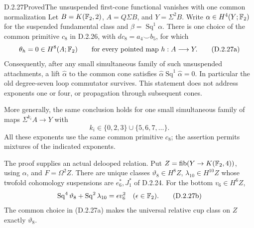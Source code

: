 \begin{claim}{D.2.27}{Proved}{The unsuspended first-cone functional vanishes with one common normalization}
Let $B=K(\mathbb F_2,2)$, $A=Q\Sigma B$, and $Y=\Sigma^2B$.
Write $\alpha\in H^4(Y;\mathbb F_2)$ for the suspended fundamental
class and $\beta=\operatorname{Sq}^1\alpha$.
There is one choice of the common primitive $c_8$ in
\textup{D.2.26}, with $dc_8=a_4\smile b_5$, for which
\[
 \theta_h=0\in H^8(A;\mathbb F_2)
 \qquad\text{for every pointed map }h:A\longrightarrow Y.
 \tag{D.2.27a}
\]
Consequently, after any small simultaneous family of such
unsuspended attachments, a lift $\widehat\alpha$ to the common
cone satisfies
$\widehat\alpha\operatorname{Sq}^1\widehat\alpha=0$.
In particular the old degree-seven loop commutator survives.
This statement does not address exponents one or four, or
propagation through subsequent cones.

More generally, the same conclusion holds for one small
simultaneous family of maps $\Sigma^{k_i}A\to Y$ with
\[
 k_i\in\{0,2,3\}\cup\{5,6,7,\ldots\}.
 \tag{D.2.27a'}
\]
All these exponents use the same common primitive $c_8$;
the assertion permits mixtures of the indicated exponents.

The proof supplies an actual delooped relation. Put
$Z=\operatorname{fib}(Y\to K(\mathbb F_2,4))$, using $\alpha$,
and $F=\Omega^2Z$. There are unique classes
$\vartheta_8\in H^8Z$, $\lambda_{10}\in H^{10}Z$ whose
twofold cohomology suspensions are $e_6^*,J_1^*$ of
\textup{D.2.24}. For the bottom $v_6\in H^6Z$,
\[
 \operatorname{Sq}^4\vartheta_8+
 \operatorname{Sq}^2\lambda_{10}
       =\epsilon v_6^2\quad(\epsilon\in\mathbb F_2).
 \tag{D.2.27b}
\]
The common choice in \textup{(D.2.27a)} makes the universal
relative cup class on $Z$ exactly $\vartheta_8$.
\end{claim}
